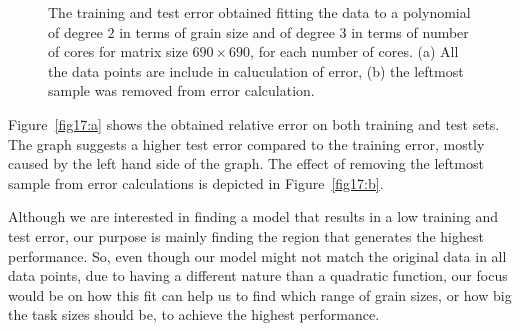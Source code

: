 \vspace{\baselineskip}	
\begin{figure}[H]
	\centering
	\caption{The training and test error obtained fitting the data to a polynomial of degree $2$ in terms of grain size and of degree $3$ in terms of number of cores for matrix size $690\times690$, for each number of cores. (a) All the data points are include in caluculation of error, (b) the leftmost sample was removed from error calculation.}	
	\label{fig17}
\end{figure}

Figure~\ref{fig17:a} shows the obtained relative error on both training and test sets. The graph suggests a higher test error compared to the training error, mostly caused by the left hand side of the graph. The effect of removing the leftmost sample from error calculations is depicted in Figure~\ref{fig17:b}.

Although we are interested in finding a model that results in a low training and test error, our purpose is mainly finding the region that generates the highest performance. So, even though our model might not match the original data in all data points, due to having a different nature than a quadratic function, our focus would be on how this fit can help us to find which range of grain sizes, or how big the task sizes should be, to achieve the highest performance. 



